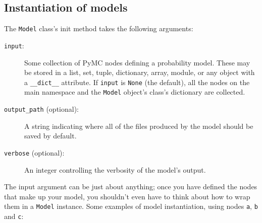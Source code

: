 \subsection*{Instantiation of models} \label{sec:ModelInstantiation}
The \texttt{Model} class's init method takes the following arguments:
\begin{description}
    \item[\texttt{input}:] Some collection of PyMC nodes defining a probability model. These may be stored in a list, set, tuple, dictionary, array, module, or any object with a \texttt{__dict__} attribute. If \texttt{input} is \texttt{None} (the default), all the nodes on the main namespace and the \texttt{Model} object's class's dictionary are collected.
    \item[\texttt{output_path} (optional):] A string indicating where all of the files produced by the model should be saved by default.
    \item[\texttt{verbose} (optional):] An integer controlling the verbosity of the model's output.
\end{description}
The input argument can be just about anything; once you have defined the nodes that make up your model, you shouldn't even have to think about how to wrap them in a \texttt{Model} instance. Some examples of model instantiation, using nodes \texttt{a}, \texttt{b} and \texttt{c}:
